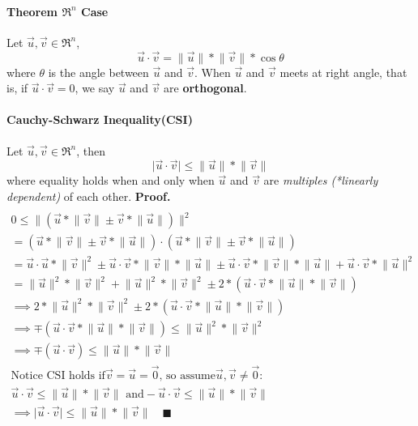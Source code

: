\documentclass{article}
\begin{document}
	\paragraph{Theorem $\Re^n$ Case} Let $\vec{u},\vec{v} \in \Re^n$,
	\[
		\vec{u} \cdot \vec{v} = \lVert \vec{u} \rVert * \lVert \vec{v} \rVert * \cos{\theta}
	\]
	where $\theta$ is the angle between $\vec{u}$ and $\vec{v}$. When $\vec{u}$ and $\vec{v}$ meets at right angle, that is, if $\vec{u} \cdot \vec{v} = 0$, we say $\vec{u}$ and $\vec{v}$ are \textbf{orthogonal}.
	\paragraph{Cauchy-Schwarz Inequality(CSI)} Let $\vec{u},\vec{v} \in \Re^n$, then
	\[
		\lvert \vec{u} \cdot \vec{v} \rvert
		\leq 
		\lVert \vec{u} \rVert * \lVert \vec{v} \rVert
	\]
	where equality holds when and only when $\vec{u}$ and $\vec{v}$ are \emph{multiples (*linearly dependent)} of each other.
	\newline \textbf{Proof.}
		\begin{multline}
		\\
			0 \leq \lVert(\vec{u}*\lVert \vec{v} \rVert \pm \vec{v} * \lVert \vec{u} \rVert)\rVert^2 \\
			= (\vec{u}*\lVert\vec{v}\rVert \pm \vec{v}*\lVert\vec{u}\rVert) \cdot (\vec{u}*\lVert\vec{v}\rVert \pm \vec{v}*\lVert\vec{u}\rVert) \\
			= \vec{u} \cdot \vec{u} * \lVert\vec{v}\rVert^2 \pm \vec{u}\cdot\vec{v}*\lVert\vec{v}\rVert*\lVert\vec{u}\rVert \pm \vec{u}\cdot\vec{v}*\lVert\vec{v}\rVert * \lVert\vec{u}\rVert + \vec{u}\cdot\vec{v} * \lVert \vec{u} \rVert^2 \\
			= \lVert\vec{u}\rVert^2*\lVert\vec{v}\rVert^2 + \lVert\vec{u}\rVert^2*\lVert\vec{v}\rVert^2 \pm 2*(\vec{u}\cdot\vec{v}*\lVert\vec{u}\rVert*\lVert\vec{v}\rVert) \\
			\implies 2*\lVert\vec{u}\rVert^2*\lVert\vec{v}\rVert^2 \pm 2*(\vec{u}\cdot\vec{v}*\lVert\vec{u}\rVert*\lVert\vec{v}\rVert) \\
			\implies \mp (\vec{u}\cdot\vec{v}*\lVert\vec{u}\rVert*\lVert\vec{v}\rVert) \leq \lVert\vec{u}\rVert^2*\lVert\vec{v}\rVert^2 \\
			\implies \mp (\vec{u}\cdot\vec{v}) \leq \lVert\vec{u}\rVert * \lVert\vec{v}\rVert \\
			\text{Notice CSI holds if} \vec{v} = \vec{u} = \vec{0}\text{, so assume} \vec{u},\vec{v} \neq \vec{0}:\\
			\vec{u} \cdot \vec{v} \leq \lVert\vec{u}\rVert * \lVert\vec{v}\rVert \text{ and}
			- \vec{u} \cdot \vec{v} \leq \lVert\vec{u}\rVert * \lVert\vec{v}\rVert \\
			\implies \lvert \vec{u} \cdot \vec{v} \rvert \leq \lVert\vec{u}\rVert * \lVert\vec{v}\rVert \quad \blacksquare
			\\
		\end{multline}
\end{document}

